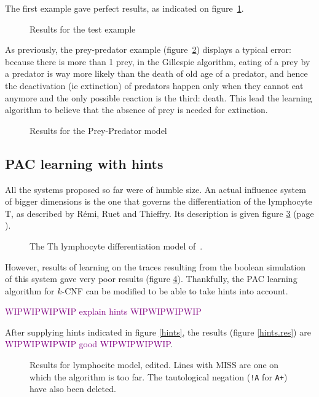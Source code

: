 \documentclass{llncs}
\newcommand{\wip}[1]{\textcolor{Purple}{WIPWIPWIPWIP #1 WIPWIPWIPWIP}}
\begin{document}
The first example gave perfect results, as indicated on figure~\ref{test_res}.
\begin{figure}
	
	\caption{Results for the test example\label{test_res}}
\end{figure}

As previously, the prey-predator example (figure~\ref{preypred_res}) displays a typical error: because there is more than 1 prey, in the Gillespie algorithm, eating of a prey by a predator is way more likely than the death of old age of a predator, and hence the deactivation (ie extinction) of predators happen only when they cannot eat anymore and the only possible reaction is the third: death. This lead the learning algorithm to believe that the absence of prey is needed for extinction.
\begin{figure}
	
	\caption{Results for the Prey-Predator model\label{preypred_res}}
\end{figure}
\subsection{PAC learning with hints}
All the systems proposed so far were of humble size. An actual influence system of bigger dimensions is the one that governs the differentiation of the lymphocyte T, as described by R\'{e}mi, Ruet and Thieffry\cite{RRMTC06tcsb}. Its description is given figure \ref{lympho} (page \pageref{lympho}).

\begin{figure}[htbp]
	
	\vspace{-1em}
	\caption{The Th lymphocyte differentiation model of~\cite{RRMTC06tcsb}.\label{lympho}}
\end{figure}
However, results of learning on the traces resulting from the boolean simulation of this system gave very poor results (figure \ref{lympho_res}). Thankfully, the PAC learning algorithm for $k$-CNF can be modified to be able to take hints into account.

\wip{explain hints}

After supplying hints indicated in figure \ref{hints}, the results (figure \ref{hints.res}) are \wip{good}.
	
\begin{figure}
	
	\caption{Results for lymphocite model, edited. Lines with MISS are one on which the algorithm is too far. The tautological negation (\texttt{!A} for \texttt{A+}) have also been deleted.\label{lympho_res}}
\end{figure}
\end{document}

